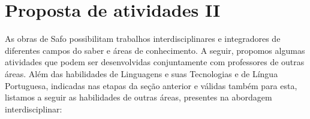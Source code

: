 \documentclass[12pt]{extarticle}
\begin{document}
\section{Proposta de atividades II}


As obras de Safo possibilitam trabalhos interdisciplinares e
integradores de diferentes campos do saber e áreas de conhecimento. A
seguir, propomos algumas atividades que podem ser desenvolvidas
conjuntamente com professores de outras áreas. Além das habilidades de
Linguagens e suas Tecnologias e de Língua Portuguesa, indicadas nas
etapas da seção anterior e válidas também para esta, listamos a seguir
as habilidades de outras áreas, presentes na abordagem interdisciplinar:






\end{document}
